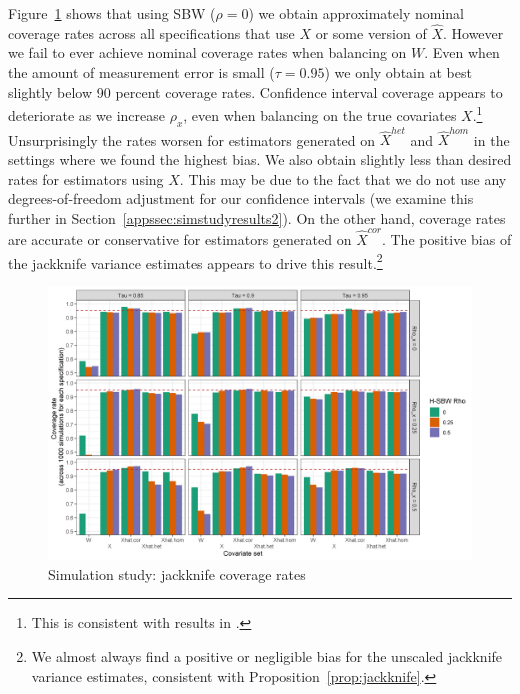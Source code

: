 Figure~\ref{fig:simcoverage1} shows that using SBW ($\rho = 0$) we obtain approximately nominal coverage rates across all specifications that use $X$ or some version of $\hat{X}$. However we fail to ever achieve nominal coverage rates when balancing on $W$. Even when the amount of measurement error is small ($\tau = 0.95$) we only obtain at best slightly below 90 percent coverage rates. Confidence interval coverage appears to deteriorate as we increase $\rho_x$, even when balancing on the true covariates $X$.\footnote{This is consistent with results in \citet{cameron2008bootstrap}.} Unsurprisingly the rates worsen for estimators generated on $\hat{X}^{het}$ and $\hat{X}^{hom}$ in the settings where we found the highest bias. We also obtain slightly less than desired rates for estimators using $X$. This may be due to the fact that we do not use any degrees-of-freedom adjustment for our confidence intervals (we examine this further in Section~\ref{appssec:simstudyresults2}). On the other hand, coverage rates are accurate or conservative for estimators generated on $\hat{X}^{cor}$. The positive bias of the jackknife variance estimates appears to drive this result.\footnote{We almost always find a positive or negligible bias for the unscaled jackknife variance estimates, consistent with Proposition~\ref{prop:jackknife}.}

\begin{figure}[H]
\begin{center}
    \caption{Simulation study: jackknife coverage rates}\label{fig:simcoverage1}
    \includegraphics[scale=0.5]{01_Plots/coverage-plot-1.png}
\end{center}
\end{figure}

